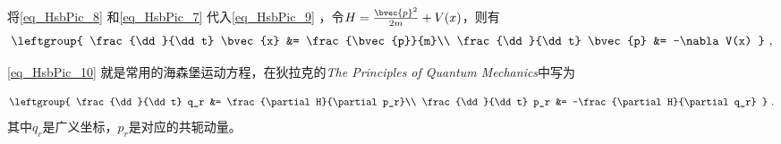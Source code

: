 将\autoref{eq_HsbPic_8} 和\autoref{eq_HsbPic_7} 代入\autoref{eq_HsbPic_9} ，令$H=\frac{\bvec{p}^2}{2m}+V(x)$，则有
\begin{equation}\label{eq_HsbPic_10}
\leftgroup{
    \frac{\dd}{\dd t} \bvec{x} &= \frac{\bvec{p}}{m}\\
    \frac{\dd}{\dd t} \bvec{p} &= -\nabla V(x)
}~,
\end{equation}


\autoref{eq_HsbPic_10} 就是常用的海森堡运动方程，在狄拉克的\textsl{The Principles of Quantum Mechanics}中写为

\begin{equation}\label{eq_HsbPic_11}
\leftgroup{
    \frac{\dd}{\dd t} q_r &= \frac{\partial H}{\partial p_r}\\
    \frac{\dd}{\dd t} p_r &= -\frac{\partial H}{\partial q_r} 
}~.
\end{equation}
其中$q_r$是广义坐标，$p_r$是对应的共轭动量。
